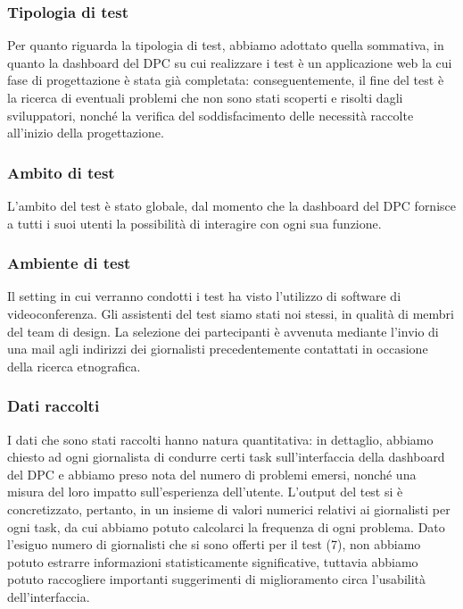 \subsubsection{Tipologia di test}
\label{sss:tipologia-test}
Per quanto riguarda la tipologia di test, abbiamo adottato quella sommativa, in quanto la dashboard del DPC su cui realizzare i test è un applicazione web la cui fase di progettazione è stata già completata: conseguentemente, il fine del test è la ricerca di eventuali problemi che non sono stati scoperti e risolti dagli sviluppatori, nonché la verifica del soddisfacimento delle necessità raccolte all'inizio della progettazione.

\subsubsection{Ambito di test}
\label{sss:ambito-test}
L'ambito del test è stato globale, dal momento che la dashboard del DPC fornisce a tutti i suoi utenti la possibilità di interagire con ogni sua funzione.

\subsubsection{Ambiente di test}
\label{sss:ambiente-test}
Il setting in cui verranno condotti i test ha visto l'utilizzo di software di videoconferenza. Gli assistenti del test siamo stati noi stessi, in qualità di membri del team di design. La selezione dei partecipanti è avvenuta mediante l'invio di una mail agli indirizzi dei giornalisti precedentemente contattati in occasione della ricerca etnografica.

\subsubsection{Dati raccolti}
\label{sss:dati-raccolti}
I dati che sono stati raccolti hanno natura quantitativa: in dettaglio, abbiamo chiesto ad ogni giornalista di condurre certi task sull'interfaccia della dashboard del DPC e abbiamo preso nota del numero di problemi emersi, nonché una misura del loro impatto sull'esperienza dell'utente. L'output del test si è concretizzato, pertanto, in un insieme di valori numerici relativi ai giornalisti per ogni task, da cui abbiamo potuto calcolarci la frequenza di ogni problema.
Dato l'esiguo numero di giornalisti che si sono offerti per il test (7), non abbiamo potuto estrarre informazioni statisticamente significative, tuttavia abbiamo potuto raccogliere importanti suggerimenti di miglioramento circa l'usabilità dell'interfaccia.

